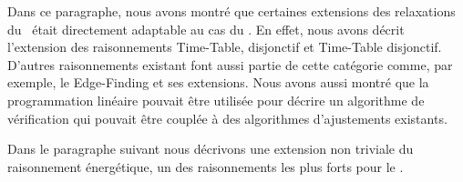 Dans ce paragraphe, nous avons montré que certaines extensions des
relaxations du \CUSP~était directement adaptable au cas du \CECSP. En
effet, nous avons décrit l'extension des raisonnements Time-Table,
disjonctif et Time-Table disjonctif. D'autres raisonnements existant
font aussi partie de cette catégorie comme, par exemple, le
Edge-Finding et ses extensions. Nous avons aussi montré que la
programmation linéaire pouvait être utilisée pour décrire un
algorithme de vérification qui pouvait être couplée à des algorithmes
d'ajustements existants.

Dans le paragraphe suivant nous décrivons une extension non triviale du
raisonnement énergétique, un des raisonnements les plus forts pour le \CUSP.